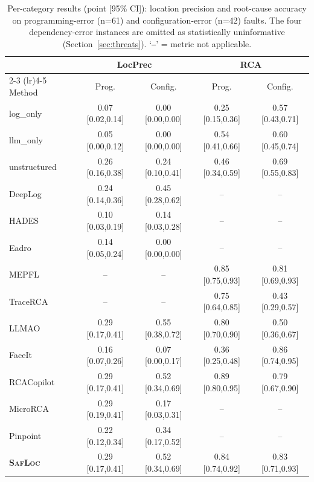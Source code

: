 \documentclass[runningheads]{llncs}
\begin{document}
\begin{table}[t]
  \centering
  \caption{Per-category results (point [95\% CI]): location precision and root-cause accuracy on programming-error (n=61) and configuration-error (n=42) faults. The four dependency-error instances are omitted as statistically uninformative (Section~\ref{sec:threats}). `\texttt{--}' = metric not applicable.}
  \label{tab:percat}
  \setlength{\tabcolsep}{3pt}
  \footnotesize
  \begin{tabular}{lcccc}
    \toprule
    & \multicolumn{2}{c}{LocPrec} & \multicolumn{2}{c}{RCA} \\
    \cmidrule(lr){2-3} \cmidrule(lr){4-5}
    Method & Prog. & Config. & Prog. & Config. \\
    \midrule
    log\_only & 0.07 [0.02,0.14] & 0.00 [0.00,0.00] & 0.25 [0.15,0.36] & 0.57 [0.43,0.71] \\
    llm\_only & 0.05 [0.00,0.12] & 0.00 [0.00,0.00] & 0.54 [0.41,0.66] & 0.60 [0.45,0.74] \\
    unstructured & 0.26 [0.16,0.38] & 0.24 [0.10,0.41] & 0.46 [0.34,0.59] & 0.69 [0.55,0.83] \\
    DeepLog & 0.24 [0.14,0.36] & 0.45 [0.28,0.62] & -- & -- \\
    HADES & 0.10 [0.03,0.19] & 0.14 [0.03,0.28] & -- & -- \\
    Eadro & 0.14 [0.05,0.24] & 0.00 [0.00,0.00] & -- & -- \\
    MEPFL & -- & -- & 0.85 [0.75,0.93] & 0.81 [0.69,0.93] \\
    TraceRCA & -- & -- & 0.75 [0.64,0.85] & 0.43 [0.29,0.57] \\
    LLMAO & 0.29 [0.17,0.41] & 0.55 [0.38,0.72] & 0.80 [0.70,0.90] & 0.50 [0.36,0.67] \\
    FaceIt & 0.16 [0.07,0.26] & 0.07 [0.00,0.17] & 0.36 [0.25,0.48] & 0.86 [0.74,0.95] \\
    RCACopilot & 0.29 [0.17,0.41] & 0.52 [0.34,0.69] & 0.89 [0.80,0.95] & 0.79 [0.67,0.90] \\
    MicroRCA & 0.29 [0.19,0.41] & 0.17 [0.03,0.31] & -- & -- \\
    Pinpoint & 0.22 [0.12,0.34] & 0.34 [0.17,0.52] & -- & -- \\
    \midrule
    \textbf{\textsc{SafLoc}} & 0.29 [0.17,0.41] & 0.52 [0.34,0.69] & 0.84 [0.74,0.92] & 0.83 [0.71,0.93] \\
    \bottomrule
  \end{tabular}
\end{table}
\end{document}
